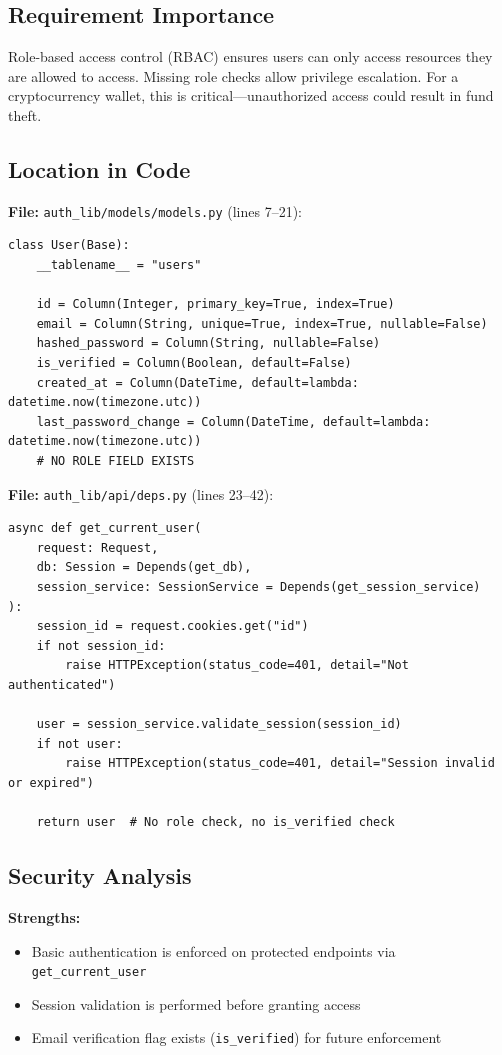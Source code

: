 \documentclass[11pt,a4paper]{article}
\begin{document}
\subsection{Requirement Importance}
Role-based access control (RBAC) ensures users can only access resources they are allowed to access. Missing role checks allow privilege escalation. For a cryptocurrency wallet, this is critical---unauthorized access could result in fund theft.

\subsection{Location in Code}

\textbf{File:} \texttt{auth\_lib/models/models.py} (lines 7--21):
\begin{lstlisting}
class User(Base):
    __tablename__ = "users"
    
    id = Column(Integer, primary_key=True, index=True)
    email = Column(String, unique=True, index=True, nullable=False)
    hashed_password = Column(String, nullable=False)
    is_verified = Column(Boolean, default=False)
    created_at = Column(DateTime, default=lambda: datetime.now(timezone.utc))
    last_password_change = Column(DateTime, default=lambda: datetime.now(timezone.utc))
    # NO ROLE FIELD EXISTS
\end{lstlisting}

\textbf{File:} \texttt{auth\_lib/api/deps.py} (lines 23--42):
\begin{lstlisting}
async def get_current_user(
    request: Request,
    db: Session = Depends(get_db),
    session_service: SessionService = Depends(get_session_service)
):
    session_id = request.cookies.get("id")
    if not session_id:
        raise HTTPException(status_code=401, detail="Not authenticated")
    
    user = session_service.validate_session(session_id)
    if not user:
        raise HTTPException(status_code=401, detail="Session invalid or expired")
    
    return user  # No role check, no is_verified check
\end{lstlisting}

\subsection{Security Analysis}

\textbf{Strengths:}
\begin{itemize}[noitemsep]
    \item Basic authentication is enforced on protected endpoints via \texttt{get\_current\_user}
    \item Session validation is performed before granting access
    \item Email verification flag exists (\texttt{is\_verified}) for future enforcement
\end{itemize}
\end{document}
